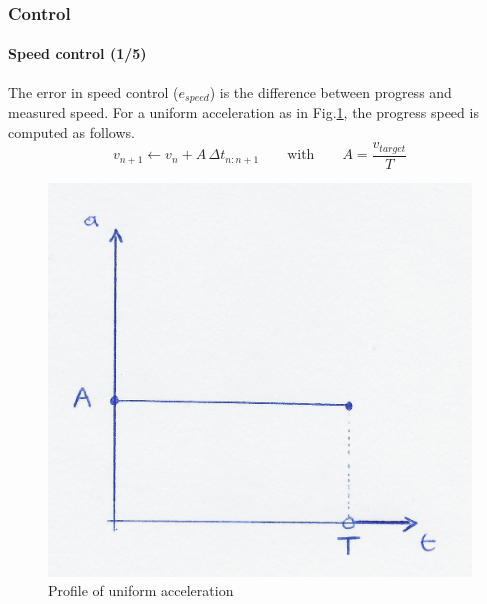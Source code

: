 \documentclass[10pt]{beamer}
\begin{document}
\begin{frame}
\frametitle{Control}
\framesubtitle{Speed control (1/5)}
The error in speed control ($e_{speed}$) is the difference between progress and measured speed. For a uniform acceleration as in Fig.\ref{fig:uniform-acc}, the progress speed is computed as follows. 
$$
v_{n+1} \leftarrow v_n + A \, \Delta t_{n:n+1}
\qquad\text{with}\qquad
A = \frac{v_{target}}{T}
$$
\begin{figure}[hbtp]
\centering
\label{fig:uniform-acc}
\includegraphics[scale=0.07]{figures/uniform-acc}
\caption{Profile of uniform acceleration}
\end{figure}
\end{frame}

\end{document}
